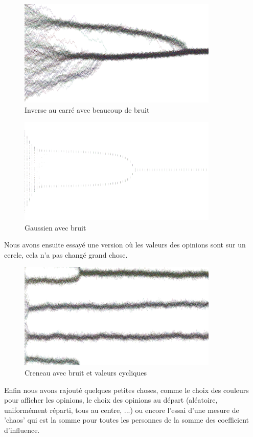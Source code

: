 \documentclass[a4paper,10pt]{article}
\begin{document}
\begin{figure}[H]
\begin{center}
\includegraphics[width=270pt]{resultatCarreBruit20_inverse.png}
\end{center}
\caption{Inverse au carré avec beaucoup de bruit}
\label{sim_carre_bruit_20}
\end{figure}

\begin{figure}[H]
\begin{center}
\includegraphics[width=270pt]{resultatGaussienBruit_inverse.png}
\end{center}
\caption{Gaussien avec bruit}
\label{sim_gaussien_bruit}
\end{figure}

Nous avons ensuite essayé une version où les valeurs des opinions sont sur un cercle, cela n'a pas changé grand chose.

\begin{figure}[H]
\begin{center}
\includegraphics[width=270pt]{resultatCyclique_inverse.png}
\end{center}
\caption{Creneau avec bruit et valeurs cycliques}
\label{sim_cyclique}
\end{figure}

Enfin nous avons rajouté quelques petites choses, comme le choix des couleurs pour afficher les opinions, le choix des opinions au départ (aléatoire, uniformément réparti, tous au centre, ...) ou encore l'essai d'une mesure de 'chaos' qui est la somme pour toutes les personnes de la somme des coefficient d'influence.
\end{document}
